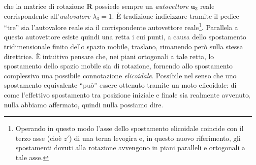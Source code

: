 che la matrice di rotazione $\bm R$
possiede sempre
un {\em autovettore} ${\bm u}_3$ reale corrispondente all'{\em autovalore}
 $\lambda_3=  1$. \`E tradizione indicizzare 
tramite il pedice ``tre'' sia l'autovalore reale
sia il corrispondente autovettore reale\footnote
{
Operando in questo modo l'asse dello spostamento elicoidale coincide
con il terzo asse (cio\`e $z'$) di una terna levogira e, in questo
nuovo riferimento, gli spostamenti dovuti alla rotazione avvengono
in piani paralleli e ortogonali a tale asse.
}. Parallela a questo autovettore esiste quindi
una retta i cui punti, a causa dello spostamento tridimensionale finito
dello spazio mobile, traslano, rimanendo per\`o sulla stessa direttrice.
\`E intuitivo pensare che, nei piani ortogonali a tale retta,
lo spostamento dello spazio mobile
sia di rotazione, fornendo  allo spostamento complessivo una possibile
connotazione {\em elicoidale}. Possibile nel senso che uno spostamento
equivalente ``pu\`o'' essere ottenuto tramite un moto elicoidale:
di come l'effettivo
spostamento tra posizione iniziale e finale sia realmente avvenuto,
nulla abbiamo affermato, quindi nulla possiamo dire.

